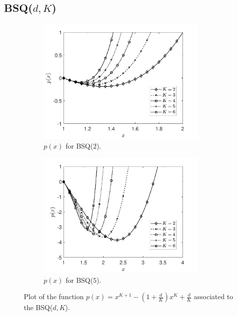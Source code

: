 \documentclass[12pt]{report}
\begin{document}
\subsection{BSQ($d,K$)}
\begin{figure}[t]
\begin{subfigure}{.45\textwidth}
\centering
\includegraphics[width=0.9\textwidth]{figures/Chapter8/fig_px_BSQdK1.pdf}
\caption{$p(x)$ for BSQ($2$).}
\label{fig:BSQ2_px}
\end{subfigure}
\begin{subfigure}{.45\textwidth}
\centering
\includegraphics[width=0.9\textwidth]{figures/Chapter8/fig_px_BSQdK2.pdf}
\caption{$p(x)$ for BSQ($5$).}
\label{fig:BSQ5_px}
\end{subfigure}
\caption{Plot of the function $p(x) = x^{K+1} - (1 + \frac{d}{K}) x^K + \frac{d}{K}$ associated to the BSQ($d,K$).}\label{fig:BSQ_px}
\end{figure}
\end{document}
